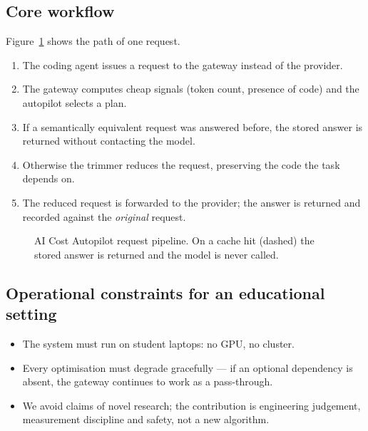 \documentclass[11pt,a4paper]{article}
\begin{document}
\subsection{Core workflow}
Figure~\ref{fig:pipeline} shows the path of one request.
\begin{enumerate}[noitemsep]
  \item The coding agent issues a request to the gateway instead of the provider.
  \item The gateway computes cheap signals (token count, presence of code) and
        the autopilot selects a plan.
  \item If a semantically equivalent request was answered before, the stored
        answer is returned without contacting the model.
  \item Otherwise the trimmer reduces the request, preserving the code the task
        depends on.
  \item The reduced request is forwarded to the provider; the answer is returned
        and recorded against the \emph{original} request.
\end{enumerate}

\begin{figure}[H]
\centering
{}
\caption{AI Cost Autopilot request pipeline. On a cache hit (dashed) the stored
answer is returned and the model is never called.}
\label{fig:pipeline}
\end{figure}

\subsection{Operational constraints for an educational setting}
\begin{itemize}[noitemsep]
  \item The system must run on student laptops: no GPU, no cluster.
  \item Every optimisation must degrade gracefully --- if an optional dependency
        is absent, the gateway continues to work as a pass-through.
  \item We avoid claims of novel research; the contribution is engineering
        judgement, measurement discipline and safety, not a new algorithm.
\end{itemize}
\end{document}

